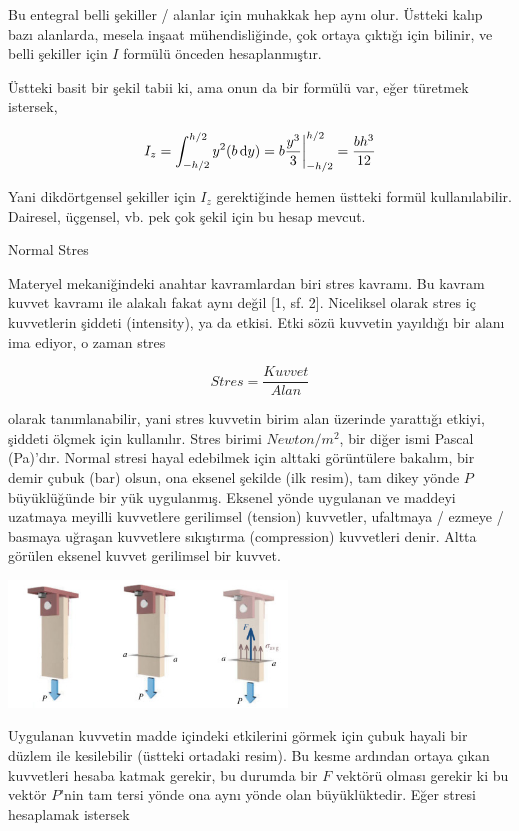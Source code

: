 \documentclass[12pt,fleqn]{article}\usepackage{../../common}
\begin{document}
Bu entegral belli şekiller / alanlar için muhakkak hep aynı olur. Üstteki kalıp
bazı alanlarda, mesela inşaat mühendisliğinde, çok ortaya çıktığı için
bilinir, ve belli şekiller için $I$ formülü önceden hesaplanmıştır.

Üstteki basit bir şekil tabii ki, ama onun da bir formülü var, eğer türetmek
istersek,

$$
I_z = \int_{-h/2}^{h/2} y^2 (b \,\mathrm{d} y) = b \frac{y^3}{3} \bigg\vert_{-h/2}^{h/2} =
\frac{b h^3}{12}
$$

Yani dikdörtgensel şekiller için $I_z$ gerektiğinde hemen üstteki formül
kullanılabilir. Dairesel, üçgensel, vb. pek çok şekil için bu hesap mevcut.

Normal Stres

Materyel mekaniğindeki anahtar kavramlardan biri stres kavramı. Bu kavram kuvvet
kavramı ile alakalı fakat aynı değil [1, sf. 2]. Niceliksel olarak stres iç
kuvvetlerin şiddeti (intensity), ya da etkisi. Etki sözü kuvvetin yayıldığı bir
alanı ima ediyor, o zaman stres

$$
Stres = \frac{Kuvvet}{Alan}
$$

olarak tanımlanabilir, yani stres kuvvetin birim alan üzerinde yarattığı etkiyi,
şiddeti ölçmek için kullanılır. Stres birimi $Newton / m^2$, bir diğer ismi
Pascal (Pa)'dır. Normal stresi hayal edebilmek için alttaki görüntülere bakalım,
bir demir çubuk (bar) olsun, ona eksenel şekilde (ilk resim), tam dikey yönde
$P$ büyüklüğünde bir yük uygulanmış. Eksenel yönde uygulanan ve maddeyi uzatmaya
meyilli kuvvetlere gerilimsel (tension) kuvvetler, ufaltmaya / ezmeye / basmaya
uğraşan kuvvetlere sıkıştırma (compression) kuvvetleri denir. Altta görülen
eksenel kuvvet gerilimsel bir kuvvet.

\includegraphics[width=20em]{phy_020_strs_01_01.jpg}

Uygulanan kuvvetin madde içindeki etkilerini görmek için çubuk hayali bir düzlem
ile kesilebilir (üstteki ortadaki resim). Bu kesme ardından ortaya çıkan
kuvvetleri hesaba katmak gerekir, bu durumda bir $F$ vektörü olması gerekir ki
bu vektör $P$'nin tam tersi yönde ona aynı yönde olan büyüklüktedir. Eğer stresi
hesaplamak istersek
\end{document}
